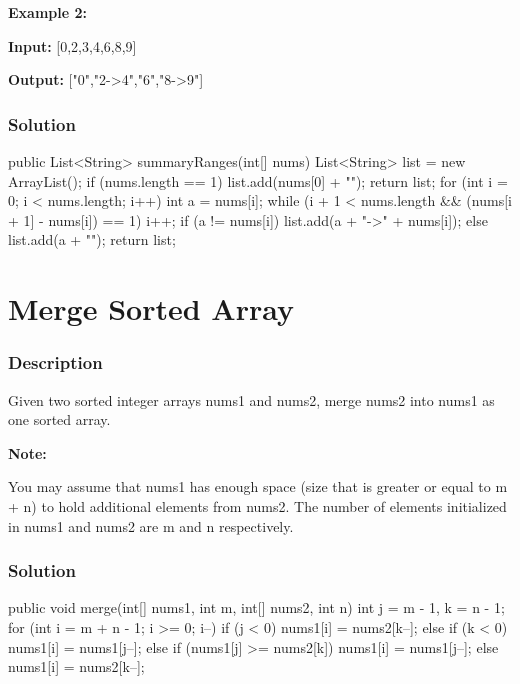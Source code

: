 \textbf{Example 2:}

\textbf{Input:} [0,2,3,4,6,8,9]

\textbf{Output:} ["0","2->4","6","8->9"]

\subsubsection{Solution}

\begin{Code}
public List<String> summaryRanges(int[] nums) {
    List<String> list = new ArrayList();
    if (nums.length == 1) {
        list.add(nums[0] + "");
        return list;
    }
    for (int i = 0; i < nums.length; i++) {
        int a = nums[i];
        while (i + 1 < nums.length && (nums[i + 1] - nums[i]) == 1) {
            i++;
        }
        if (a != nums[i]) {
            list.add(a + "->" + nums[i]);
        } else {
            list.add(a + "");
        }
    }
    return list;
}
\end{Code}

\newpage

\section{Merge Sorted Array} %

\subsubsection{Description}
Given two sorted integer arrays nums1 and nums2, merge nums2 into nums1 as one sorted array.

\textbf{Note:}

You may assume that nums1 has enough space (size that is greater or equal to m + n) to hold additional elements from nums2. The number of elements initialized in nums1 and nums2 are m and n respectively.

\subsubsection{Solution}

\begin{Code}
public void merge(int[] nums1, int m, int[] nums2, int n) {
    int j = m - 1, k = n - 1;
    for (int i = m + n - 1; i >= 0; i--) {
        if (j < 0) {
            nums1[i] = nums2[k--];
        } else if (k < 0) {
            nums1[i] = nums1[j--];
        } else {
            if (nums1[j] >= nums2[k]) {
                nums1[i] = nums1[j--];
            } else {
                nums1[i] = nums2[k--];
            }
        }
    }
}
\end{Code}

